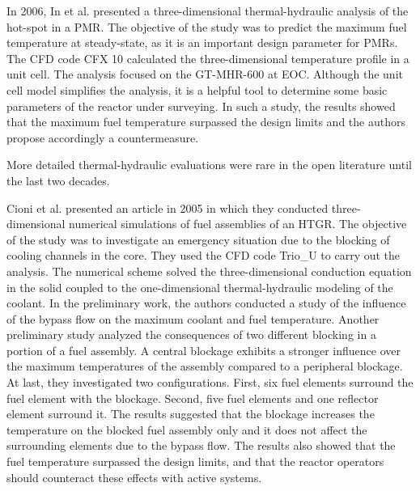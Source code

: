 \documentclass[11pt,letterpaper]{article}
\begin{document}
In 2006, In et al. \cite{in_three-dimensional_2006} presented a three-dimensional thermal-hydraulic analysis of the hot-spot in a \gls{PMR}.
The objective of the study was to predict the maximum fuel temperature at steady-state, as it is an important design parameter for \glspl{PMR}.
The CFD code CFX 10 \cite{ansys_inc_cfx_2006} calculated the three-dimensional temperature profile in a unit cell.
The analysis focused on the GT-MHR-600 at \gls{EOC}.
Although the unit cell model simplifies the analysis, it is a helpful tool to determine some basic parameters of the reactor under surveying.
In such a study, the results showed that the maximum fuel temperature surpassed the design limits and the authors propose accordingly a countermeasure.

More detailed thermal-hydraulic evaluations were rare in the open literature until the last two decades.

Cioni et al. \cite{cioni_3d_2006} presented an article in 2005 in which they conducted three-dimensional numerical simulations of fuel assemblies of an \gls{HTGR}.
The objective of the study was to investigate an emergency situation due to the blocking of cooling channels in the core.
They used the \gls{CFD} code Trio_U \cite{bieder_priceles_2000} to carry out the analysis.
The numerical scheme solved the three-dimensional conduction equation in the solid coupled to the one-dimensional thermal-hydraulic modeling of the coolant.
In the preliminary work, the authors conducted a study of the influence of the bypass flow on the maximum coolant and fuel temperature.
Another preliminary study analyzed the consequences of two different blocking in a portion of a fuel assembly.
A central blockage exhibits a stronger influence over the maximum temperatures of the assembly compared to a peripheral blockage.
At last, they investigated two configurations.
First, six fuel elements surround the fuel element with the blockage.
Second, five fuel elements and one reflector element surround it.
The results suggested that the blockage increases the temperature on the blocked fuel assembly only and it does not affect the surrounding elements due to the bypass flow.
The results also showed that the fuel temperature surpassed the design limits, and that the reactor operators should counteract these effects with active systems.
\end{document}
